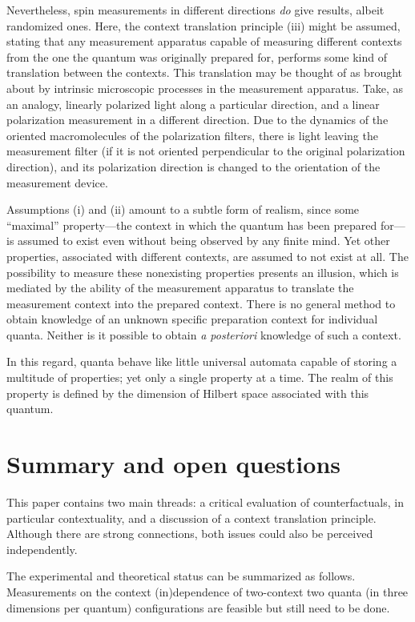 \documentclass{aipproc}
\begin{document}
Nevertheless, spin measurements in different directions {\em do}
give results, albeit randomized ones.
Here, the context translation principle (iii) might be assumed,
stating that any measurement apparatus capable of measuring different contexts from the one
the quantum was originally prepared for, performs some kind of translation between the contexts.
This translation may be thought of as brought about
by intrinsic microscopic processes in the measurement apparatus.
Take, as an analogy, linearly polarized light along a particular
direction, and a linear polarization measurement in a different direction.
Due to the dynamics of the oriented macromolecules of the polarization filters,
there is light leaving the measurement filter
(if it is not oriented perpendicular to the original polarization direction),
and its polarization direction is changed to the orientation of the measurement device.


Assumptions (i) and (ii) amount to a subtle form of realism,
since some ``maximal'' property---the context in which the quantum has been prepared for---is assumed to
exist even without being observed by any finite mind.
Yet other properties, associated with different contexts, are assumed to not exist at all.
The possibility to measure these nonexisting properties presents an illusion,
which is mediated by the ability of the measurement apparatus to translate
the measurement context into the prepared context.
There is no general method
to obtain knowledge of an unknown specific preparation context for individual quanta.
Neither is it possible to obtain {\it a posteriori} knowledge of such a context.

In this regard, quanta behave like little universal automata capable of storing a multitude of properties;
yet only a single property at a time.
The realm of this property is defined by the dimension of Hilbert space associated with this quantum.

\section{Summary and open questions}

This paper contains two main threads: a critical evaluation of counterfactuals, in particular contextuality,
and a discussion of a context translation principle.
Although there are strong connections,
both issues could also be perceived independently.

The experimental and theoretical status can be summarized as follows.
Measurements on the context (in)dependence
of two-context two quanta (in three dimensions per quantum) configurations
are feasible but still need to be done.
\end{document}
